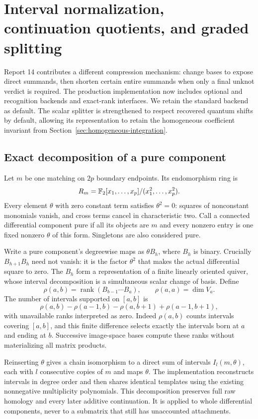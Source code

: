 \section{Interval normalization, continuation quotients, and graded splitting}
\label{sec:continuation-integration}

Report 14 contributes a different compression mechanism: change bases to
expose direct summands, then shorten certain entire summands when only a
final unknot verdict is required. The production implementation now includes
optional  and  recognition backends and exact-rank
interfaces. We retain the standard backend as default. The scalar splitter
is strengthened to respect recovered quantum shifts by default, allowing
its representation to retain the homogeneous coefficient invariant from
Section~\ref{sec:homogeneous-integration}.

\subsection{Exact decomposition of a pure component}
Let $m$ be one matching on $2p$ boundary endpoints. Its endomorphism ring is
\[
 R_m=\mathbb{F}_2[x_1,\ldots,x_p]/(x_1^2,\ldots,x_p^2).
\]
Every element $\theta$ with zero constant term satisfies $\theta^2=0$:
squares of nonconstant monomials vanish, and cross terms cancel in
characteristic two. Call a connected differential component pure if all
its objects are $m$ and every nonzero entry is one fixed nonzero
$\theta$ of this form. Singletons are also considered pure.

Write a pure component's degreewise maps as $\theta B_h$, where $B_h$
is binary. Crucially $B_{h+1}B_h$ need not vanish: it is the factor
$\theta^2$ that makes the actual differential square to zero. The $B_h$
form a representation of a finite linearly oriented quiver, whose interval
decomposition is a simultaneous scalar change of basis. Define
\[
 \rho(a,b)=\operatorname{rank}(B_{b-1}\cdots B_a),\qquad
 \rho(a,a)=\dim V_a.
\]
The number of intervals supported on $[a,b]$ is
\[
 \rho(a,b)-\rho(a-1,b)-\rho(a,b+1)+\rho(a-1,b+1),
\]
with unavailable ranks interpreted as zero. Indeed $\rho(a,b)$ counts
intervals covering $[a,b]$, and this finite difference selects exactly
the intervals born at $a$ and ending at $b$. Successive image-space bases
compute these ranks without materializing all matrix products.

Reinserting $\theta$ gives a chain isomorphism to a direct sum of intervals
$I_l(m,\theta)$, each with $l$ consecutive copies of $m$ and maps
$\theta$. The implementation reconstructs intervals in degree order and
then shares identical templates using the existing nonnegative
multiplicity polynomials. This decomposition preserves full raw homology
and every later additive continuation. It is applied to whole differential
components, never to a submatrix that still has unaccounted attachments.

